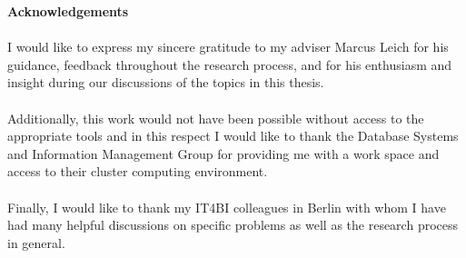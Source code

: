\begin{center}
\textbf{Acknowledgements}
\end{center}

\paragraph{}
I would like to express my sincere gratitude to my adviser Marcus Leich for his guidance, feedback throughout the research process, and for his enthusiasm and insight during our discussions of the topics in this thesis.

\paragraph{}
Additionally, this work would not have been possible without access to the appropriate tools and in this respect I would like to thank the Database Systems and Information Management Group for providing me with a work space and access to their cluster computing environment.

\paragraph{}
Finally, I would like to thank my IT4BI colleagues in Berlin with whom I have had many helpful discussions on specific problems as well as the research process in general.